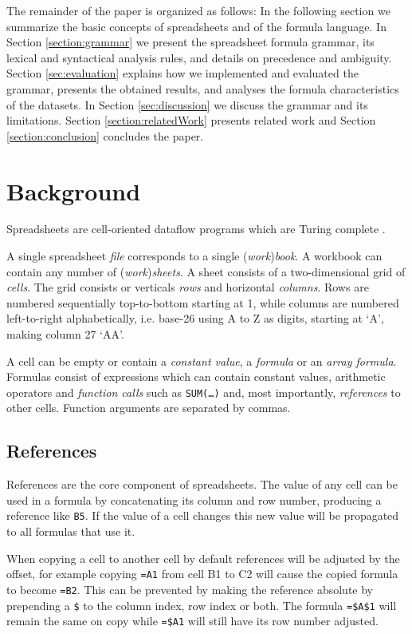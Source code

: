 \documentclass[conference]{IEEEtran}
\begin{document}
The remainder of the paper is organized as follows: In the following section we summarize the basic concepts of spreadsheets and of the formula language. In Section \ref{section:grammar} we present the spreadsheet formula grammar, its lexical and syntactical analysis rules, and details on precedence and ambiguity. Section \ref{sec:evaluation} explains how we implemented and evaluated the grammar, presents the obtained results, and analyses the formula characteristics of the datasets. In Section \ref{sec:discussion} we discuss the grammar and its limitations. Section \ref{section:relatedWork} presents related work and Section \ref{section:conclusion} concludes the paper.

\section{Background}

Spreadsheets are cell-oriented dataflow programs which are Turing complete \cite{ExcelTuringComplete}.

A single spreadsheet \emph{file} corresponds to a single (\emph{work})\emph{book}.
A workbook can contain any number of (\emph{work})\emph{sheets}.
A sheet consists of a two-dimensional grid of \emph{cells}.
The grid consists or verticals \emph{rows} and horizontal \emph{columns}.
Rows are numbered sequentially top-to-bottom starting at 1, while columns are numbered left-to-right alphabetically, i.e. base-26 using A to Z as digits, starting at `A', making column 27 `AA'.

A cell can be empty or contain a \emph{constant value}, a \emph{formula} or an \emph{array formula}.
Formulas consist of expressions which can contain constant values, arithmetic operators and \emph{function calls} such as \texttt{SUM(\ldots)} and, most importantly, \emph{references} to other cells.
Function arguments are separated by commas.

\subsection{References}
References are the core component of spreadsheets.
The value of any cell can be used in a formula by concatenating its column and row number, producing a reference like \texttt{B5}.
If the value of a cell changes this new value will be propagated to all formulas that use it.

When copying a cell to another cell by default references will be adjusted by the offset, for example copying \texttt{=A1} from cell B1 to C2 will cause the copied formula to become \texttt{=B2}.
This can be prevented by making the reference absolute by prepending a \texttt{\$} to the column index, row index or both.
The formula \texttt{=\$A\$1} will remain the same on copy while \texttt{=\$A1} will still have its row number adjusted.
\end{document}
